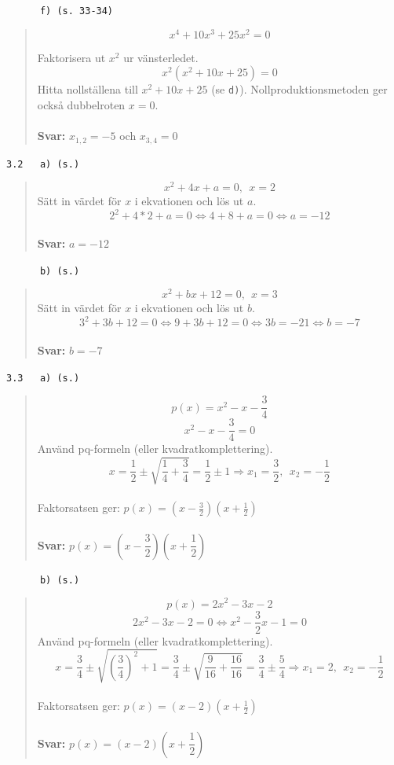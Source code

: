 \documentclass[a4paper]{article}
\newcommand{\tskcol}[1]{\textcolor{tskcol}{#1}}
\begin{document}
	
	\texttt{\tskcol{~~~~~~f) (s. 33-34)}}
	\begin{quotation}
		\noindent
		\[x^4+10x^3+25x^2=0\] 
		
		Faktorisera ut $x^2$ ur vänsterledet. 
		\[x^2(x^2+10x+25)=0\]
		Hitta nollställena till $x^2+10x+25$ (se \texttt{\tskcol{d)}}). Nollproduktionsmetoden ger också dubbelroten $x=0$.
		\\ \\
		\textbf{Svar:} $x_{1,2}=-5$ och $x_{3,4}=0$
	\end{quotation}
	
	\pagebreak
	\texttt{\tskcol{3.2~~~a) (s.)}}
	\begin{quotation}
		\noindent
		\[x^2+4x+a=0,~~x=2\]
		Sätt in värdet för $x$ i ekvationen och lös ut $a$.
		\[2^2+4*2+a=0\Leftrightarrow 4+8+a=0\Leftrightarrow a=-12\]
		\\
		\textbf{Svar:} $a=-12$
	\end{quotation}
	
	\texttt{\tskcol{~~~~~~b) (s.)}}
	\begin{quotation}
		\noindent
		\[x^2+bx+12=0,~~x=3\]
		Sätt in värdet för $x$ i ekvationen och lös ut $b$.
		\[3^2+3b+12=0\Leftrightarrow 9+3b+12=0\Leftrightarrow 3b=-21 \Leftrightarrow b=-7\]
		\\
		\textbf{Svar:} $b=-7$
	\end{quotation}
	
	\texttt{\tskcol{3.3~~~a) (s.)}}
	\begin{quotation}
		\noindent
		\[p(x)=x^2-x-\frac{3}{4}\]
		\[x^2-x-\frac{3}{4}=0\]
		Använd pq-formeln (eller kvadratkomplettering).
		\[x=\frac{1}{2}\pm\sqrt{\frac{1}{4}+\frac{3}{4}}=\frac{1}{2}\pm 1 \Rightarrow x_1=\frac{3}{2},~~x_2=-\frac{1}{2}\] \\
		Faktorsatsen ger: $p(x)=(x-\frac{3}{2})(x+\frac{1}{2})$
		\\ \\
		\textbf{Svar:} $p(x)=\left(x-\dfrac{3}{2}\right)\left(x+\dfrac{1}{2}\right)$
	\end{quotation}
	
	\texttt{\tskcol{~~~~~~b) (s.)}}
	\begin{quotation}
		\noindent
		\[p(x)=2x^2-3x-2\]
		\[2x^2-3x-2=0 \Leftrightarrow x^2-\frac{3}{2}x-1=0\]
		Använd pq-formeln (eller kvadratkomplettering).
		\[x=\frac{3}{4}\pm\sqrt{\left(\frac{3}{4}\right)^2+1}=
		\frac{3}{4}\pm\sqrt{\frac{9}{16}+\frac{16}{16}}=
		\frac{3}{4}\pm \frac{5}{4}
		\Rightarrow x_1=2,~~x_2=-\frac{1}{2}\] \\
		Faktorsatsen ger: $p(x)=(x-2)(x+\frac{1}{2})$
		\\ \\
		\textbf{Svar:} $p(x)=\left(x-2\right)\left(x+\dfrac{1}{2}\right)$
	\end{quotation}
	
\end{document}
